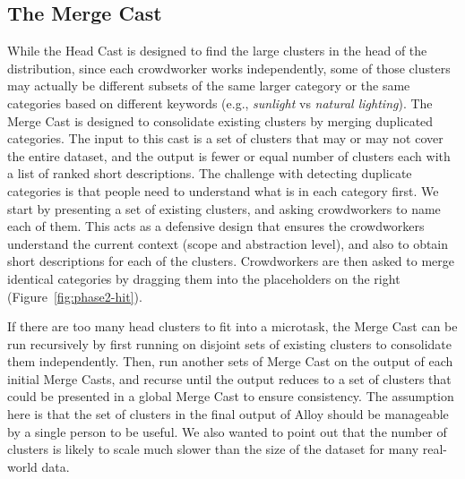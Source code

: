 \subsection{The Merge Cast}
While the Head Cast is designed to find the large clusters in the head of the
distribution, since each crowdworker works independently,
some of those clusters may actually
be different subsets of the same larger category or the same categories based
on different keywords (e.g., \emph{sunlight} vs \emph{natural lighting}).  The Merge Cast is designed to consolidate 
existing clusters by merging duplicated categories.  The input to this
cast is a set of clusters that may or may not cover the entire dataset,
and the output is fewer or equal number of clusters each with a list of ranked
short descriptions. 
The
challenge with detecting duplicate categories is that people need to understand
what is in each category first. 
We start by presenting a set of existing clusters, and asking crowdworkers to name 
each of them. This acts as a defensive design\cite{kittur2008crowdsourcing} that
ensures the crowdworkers
understand the current context (scope and abstraction level), and also to obtain
short descriptions for each of the clusters. 
Crowdworkers are
then asked to merge identical categories by dragging them into the
placeholders on the right (Figure~\ref{fig:phase2-hit}).

If there are too many head clusters to fit into a microtask,
the Merge Cast can be run recursively by
first running on disjoint sets of existing
clusters to consolidate them independently. Then, run another sets of
Merge Cast on the output of each initial Merge Casts, and recurse until
the output reduces to a set of clusters that
could be presented in a global Merge Cast to ensure consistency. 
The assumption here is that the set of clusters in the final output of Alloy should be
manageable by a single person to be useful.
We also wanted to point out that the number of clusters is likely to scale much slower than
the size of the dataset for many real-world data.





